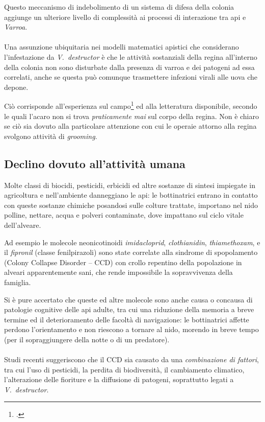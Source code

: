 Questo meccanismo di indebolimento di un sistema di difesa della colonia aggiunge un ulteriore livello di complessità ai processi di interazione tra api e \emph{Varroa}.

\paragraph{}
Una assunzione ubiquitaria nei modelli matematici apistici che considerano l'infestazione da \emph{V.~destructor} è
che le attività sostanziali della regina all'interno della colonia non sono disturbate dalla presenza di varroa e dei patogeni ad essa correlati, anche se questa può comunque trasmettere infezioni virali alle uova che depone.

Ciò corrisponde all'esperienza sul campo\footcite{privFDL,privFPan} ed alla letteratura disponibile, secondo le quali l'acaro non si trova \emph{praticamente mai} sul corpo della regina. Non è chiaro  se ciò sia dovuto alla particolare attenzione con cui le operaie attorno alla regina svolgono attività di \emph{grooming}.

\subsection{Declino dovuto all'attività umana}
\label{ssec:declinoUmano}
Molte classi di biocidi, pesticidi, erbicidi ed altre sostanze di sintesi impiegate in agricoltura e nell'ambiente
danneggiano le api: le bottinatrici entrano in contatto con queste sostanze chimiche posandosi sulle colture trattate, importano nel nido polline, nettare, acqua e polveri contaminate, dove impattano sul ciclo vitale dell'alveare.

Ad esempio le molecole neonicotinoidi \emph{imidacloprid}, \emph{clothianidin}, \emph{thiamethoxam},
e il \emph{fipronil} (classe fenilpirazoli)
sono state correlate alla sindrome di spopolamento (Colony Collapse Disorder -- CCD) con crollo repentino della popolazione in alveari apparentemente sani, che rende impossibile la sopravvivenza della famiglia.

Si è pure accertato che queste ed altre molecole sono anche causa o concausa di patologie cognitive delle api adulte, tra cui una riduzione della memoria a breve termine ed il deterioramento delle facoltà di navigazione: le bottinatrici affette perdono l'orientamento e non riescono a tornare al nido, morendo in breve tempo (per il sopraggiungere della notte o di un predatore).

\paragraph{}
Studi recenti suggeriscono che il CCD sia causato da una \emph{combinazione di fattori}, tra cui l’uso di pesticidi,
la perdita di biodiversità, il cambiamento climatico, l’alterazione delle fioriture e la diffusione di patogeni,
soprattutto legati a \emph{V.~destructor}.

